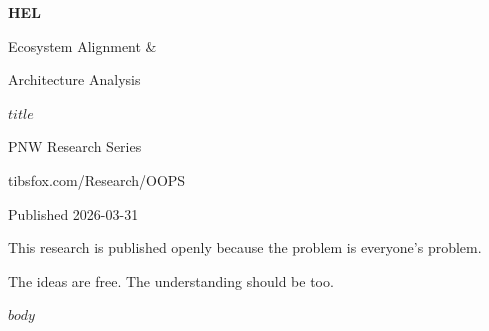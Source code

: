 \documentclass[11pt,a4paper]{article}
\begin{document}
\begin{titlepage}
\centering
\vspace*{3cm}
{\Huge\bfseries\sffamily\color{helaccent} HEL\par}
\vspace{0.5cm}
{\LARGE\sffamily Ecosystem Alignment \&\par Architecture Analysis\par}
\vspace{1cm}
{\Large\sffamily\color{helmuted} $title$\par}
\vspace{2cm}
{\large\sffamily PNW Research Series\par}
{\normalsize\sffamily tibsfox.com/Research/OOPS\par}
\vspace{1cm}
{\normalsize\sffamily\color{helmuted} Published 2026-03-31\par}
\vfill
{\small\sffamily\color{helmuted} This research is published openly because the problem is everyone's problem.\par
The ideas are free. The understanding should be too.\par}
\end{titlepage}

$body$
\end{document}
